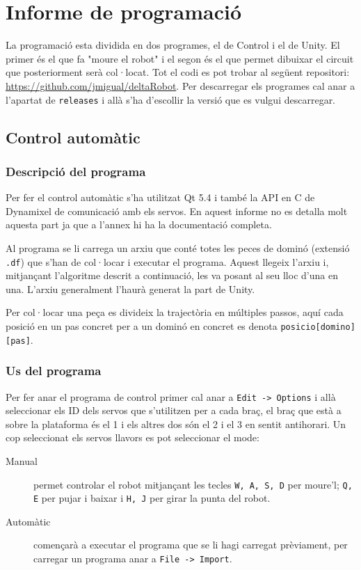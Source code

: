 \section{Informe de programació}

La programació esta dividida en dos programes, el de Control i el de Unity. El primer és el que fa "moure el robot" i el segon és el que permet dibuixar el circuit que posteriorment serà col·locat.
Tot el codi es pot trobar al següent repositori: \href{https://github.com/jmigual/deltaRobot}{https://github.com/jmigual/deltaRobot}.
Per descarregar els programes cal anar a l'apartat de \verb|releases| i allà s'ha d'escollir la versió que es vulgui descarregar.

\subsection{Control automàtic}
\subsubsection{Descripció del programa}

Per fer el control automàtic s'ha utilitzat Qt 5.4 i també la API en C de Dynamixel de comunicació amb els servos. En aquest informe no es detalla molt aquesta part ja que a l'annex hi ha la documentació completa.

Al programa se li carrega un arxiu que conté totes les peces de dominó (extensió \verb|.df|) que s'han de col·locar i executar el programa. Aquest llegeix l'arxiu i, mitjançant l'algoritme descrit a continuació, les va posant al seu lloc d'una en una. L'arxiu generalment l'haurà generat la part de Unity.

Per col·locar una peça es divideix la trajectòria en múltiples passos, aquí cada posició en un pas concret per a un dominó en concret es denota \verb|posicio[domino][pas]|.

\subsubsection{Us del programa}

Per fer anar el programa de control primer cal anar a \verb|Edit -> Options| i allà seleccionar els ID dels servos que s'utilitzen per a cada braç, el braç que està a sobre la plataforma és el 1 i els altres dos són el 2 i el 3 en sentit antihorari.
Un cop seleccionat els servos llavors es pot seleccionar el mode:
\begin{description}
\item[Manual] permet controlar el robot mitjançant les tecles \verb|W, A, S, D| per moure'l; \verb|Q, E| per pujar i baixar i \verb|H, J| per girar la punta del robot.
\item[Automàtic] començarà a executar el programa que se li hagi carregat prèviament, per carregar un programa anar a \verb|File -> Import|.
\end{description}


